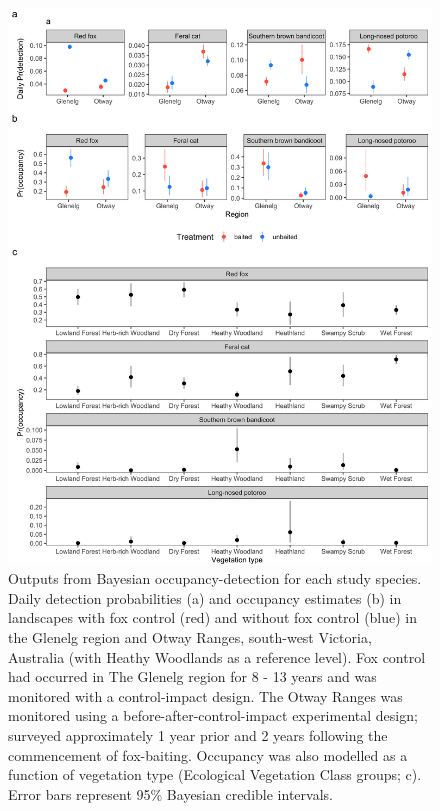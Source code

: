 \documentclass[11pt,a4paper,titlepage,twoside,openright]{style/unimelbthesis}
\begin{document}
\begin{mainmatter}
\newpage
\begin{figure}

{\centering \includegraphics[width=1\linewidth]{figure/occ_det_ubms} 

}

\caption{Outputs from Bayesian occupancy-detection for each study species. Daily detection probabilities (a) and occupancy estimates (b) in landscapes with fox control (red) and without fox control (blue) in the Glenelg region and Otway Ranges, south-west Victoria, Australia (with Heathy Woodlands as a reference level). Fox control had occurred in The Glenelg region for 8 - 13 years and was monitored with a control-impact design. The Otway Ranges was monitored using a before-after-control-impact experimental design; surveyed approximately 1 year prior and 2 years following the commencement of fox-baiting. Occupancy was also modelled as a function of vegetation type (Ecological Vegetation Class groups; c). Error bars represent 95\% Bayesian credible intervals.}\label{fig:occ-det}
\end{figure}
\newpage
\begin{figure}


\end{figure}
\end{mainmatter}
\end{document}
